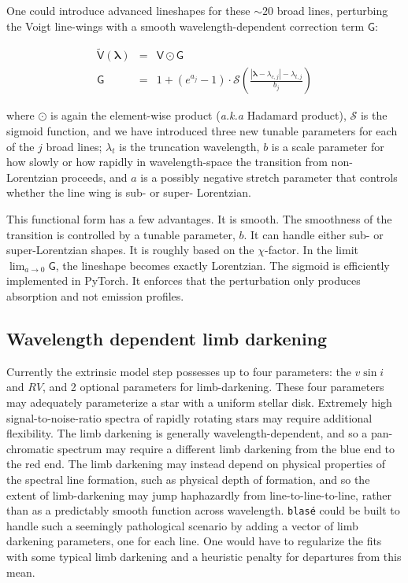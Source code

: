 \documentclass[modern]{aastex631}
\begin{document}
One could introduce advanced lineshapes for these $\sim20$ broad lines, perturbing the Voigt line-wings with a smooth wavelength-dependent correction term $\mathsf{G}$:

\begin{eqnarray}
    \mathsf{\tilde{V}(\bm{\lambda})} &=& \mathsf{V} \odot \mathsf{G}\\
    \mathsf{G} &=& 1 + (e^{a_j} - 1) \cdot \mathcal{S}\left(\frac{|\bm{\lambda}-\lambda_{c,j}| - \lambda_{t, j}}{b_j}\right)
\end{eqnarray}

where $\odot$ is again the element-wise product (\emph{a.k.a} Hadamard product), $\mathcal{S}$ is the sigmoid function, and we have introduced three new tunable parameters for each of the $j$ broad lines; $\lambda_t$ is the truncation wavelength, $b$ is a scale parameter for how slowly or how rapidly in wavelength-space the transition from non-Lorentzian proceeds, and $a$ is a possibly negative stretch parameter that controls whether the line wing is sub- or super- Lorentzian.

This functional form has a few advantages. It is smooth. The smoothness of the transition is controlled by a tunable parameter, $b$. It can handle either sub- or super-Lorentzian shapes. It is roughly based on the $\chi$-factor. In the limit $\lim_{a\to0} \mathsf{G}$, the lineshape becomes exactly Lorentzian. The sigmoid is efficiently implemented in PyTorch.
It enforces that the perturbation only produces absorption and not emission profiles.

\subsection{Wavelength dependent limb darkening}
Currently the extrinsic model step possesses up to four parameters: the $v\sin{i}$ and $RV$, and 2 optional parameters for limb-darkening.  These four parameters may adequately parameterize a star with a uniform stellar disk.  Extremely high signal-to-noise-ratio spectra of rapidly rotating stars may require additional flexibility.  The limb darkening is generally wavelength-dependent, and so a pan-chromatic spectrum may require a different limb darkening from the blue end to the red end.  The limb darkening may instead depend on physical properties of the spectral line formation, such as physical depth of formation, and so the extent of limb-darkening may jump haphazardly from line-to-line-to-line, rather than as a predictably smooth function across wavelength.  \texttt{blas\'e} could be built to handle such a seemingly pathological scenario by adding a vector of limb darkening parameters, one for each line.  One would have to regularize the fits with some typical limb darkening and a heuristic penalty for departures from this mean.
\end{document}

